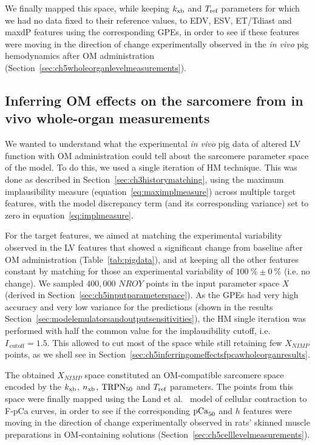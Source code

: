 \vspace{0.2cm}
We finally mapped this space, while keeping $k_{\textrm{xb}}$ and $T_{\textrm{ref}}$ parameters for which we had no data fixed to their reference values, to EDV, ESV, ET/Tdiast and maxdP features using the corresponding GPEs, in order to see if these features were moving in the direction of change experimentally observed in the \textit{in vivo} pig hemodynamics after OM administration (Section~\ref{sec:ch5wholeorganlevelmeasurements}).


%
%
%
\subsection{Inferring OM effects on the sarcomere from in vivo whole-organ measurements}\label{sec:ch5inferringomeffectsfpcawholeorgan}
We wanted to understand what the experimental \textit{in vivo} pig data of altered LV function with OM administration could tell about the sarcomere parameter space of the model. To do this, we used a single iteration of HM technique. This was done as described in Section~\ref{sec:ch3historymatching}, using the maximum implausibility measure
(equation~\eqref{eq:maximplmeasure}) across multiple target features, with the model discrepancy term (and its corresponding variance) set to zero in equation~\eqref{eq:implmeasure}.

\vspace{0.2cm}
For the target features, we aimed at matching the experimental variability observed in the LV features that showed a significant change from baseline after OM administration (Table~\ref{tab:pigdata}), and at keeping all the other features constant by matching for those an experimental variability of $\SI{100}{\percent}\pm\SI{0}{\percent}$ (i.e. no change). We sampled $400,000$ $NROY$ points in the input parameter space $X$ (derived in Section~\ref{sec:ch5inputparameterspace}). As the GPEs had very high accuracy and very low variance for the predictions (shown in the results Section~\ref{sec:modelemulatorsandoutputsensitivities}), the HM single iteration was performed with half the common value for the implausibility cutoff, i.e. $I_{\,\textrm{cutoff}}=1.5$. This allowed to cut most of the space while still retaining few $X_{NIMP}$ points, as we shell see in Section~\ref{sec:ch5inferringomeffectsfpcawholeorganresults}.

\vspace{0.2cm}
The obtained $X_{NIMP}$ space constituted an OM-compatible sarcomere space encoded by the $k_{\textrm{xb}}$, $n_{\textrm{xb}}$, $\textrm{TRPN}_{50}$ and $T_{\textrm{ref}}$ parameters. The points from this space were finally mapped using the Land et al.~\cite{Land:2012} model of cellular contraction to F-pCa curves, in order to see if the corresponding $\textrm{pCa}_{50}$ and $h$ features were moving in the direction of change experimentally observed in rats' skinned muscle preparations in OM-containing solutions (Section~\ref{sec:ch5celllevelmeasurements}).


